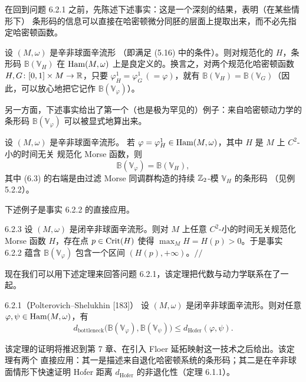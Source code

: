 在回到问题 6.2.1 之前，先陈述下述事实：这是一个深刻的结果，表明（在某些情形下）
条形码的信息可以直接在哈密顿微分同胚的层面上提取出来，而不必先指定哈密顿函数。

设 $(M,\omega)$ 是辛非球面辛流形
（即满足 (5.16) 中的条件）。则对规范化的 $H$，条形码 $\mathbb{B}(\mathbb{V}_H)$
在 $\operatorname{Ham}(M,\omega)$ 上是良定义的。换言之，对两个规范化哈密顿函数
$H,G\colon[0,1]\times M\to\mathbb{R}$，只要 $\varphi_H^1=\varphi_G^1\,(=\varphi)$，就有
$\mathbb{B}(\mathbb{V}_H)=\mathbb{B}(\mathbb{V}_G)$（因此，可以放心地把它记作
$\mathbb{B}(\mathbb{V}_\varphi)$）。

另一方面，下述事实给出了第一个（也是极为罕见的）例子：来自哈密顿动力学的条形码
$\mathbb{B}(\mathbb{V}_\varphi)$ 可以被显式地算出来。

设 $(M,\omega)$ 是辛非球面辛流形。
若 $\varphi=\varphi_H^1\in\operatorname{Ham}(M,\omega)$，其中 $H$ 是 $M$ 上 $C^2$-小的时间无关
规范化 Morse 函数，则
\begin{equation}\tag{6.3}
  \mathbb{B}(\mathbb{V}_\varphi)=\mathbb{B}(\mathbb{V}_H),
\end{equation}
其中 (6.3) 的右端是由过滤 Morse 同调群构造的持续 $\mathbb{Z}_2$-模 $\mathbb{V}_H$ 的条形码
（见例 5.2.2）。

下述例子是事实 6.2.2 的直接应用。

\begin{wexam}{6.2.3}
  设 $(M,\omega)$ 是闭辛非球面辛流形。则对 $M$ 上任意 $C^2$-小的时间无关规范化
  Morse 函数 $H$，存在点 $p\in\operatorname{Crit}(H)$ 使得 $\max_M H=H(p)>0$。于是事实 6.2.2
  蕴含 $\mathbb{B}(\mathbb{V}_\varphi)$ 包含一个区间 $(H(p),+\infty)$。\hfill$//$
\end{wexam}

现在我们可以用下述定理来回答问题 6.2.1，该定理把代数与动力学联系在了一起。

\begin{wthm}{6.2.1（Polterovich--Shelukhin [183]）}
  设 $(M,\omega)$ 是闭辛非球面辛流形。则对任意
  $\varphi,\psi\in\operatorname{Ham}(M,\omega)$，有
  \[
    d_{\mathrm{bottleneck}}\bigl(\mathbb{B}(\mathbb{V}_\varphi),
    \mathbb{B}(\mathbb{V}_\psi)\bigr)\le d_{\mathrm{Hofer}}(\varphi,\psi).
  \]
\end{wthm}

该定理的证明将推迟到第 7 章、在引入 Floer 延拓映射这一技术之后给出。该定理有两个
直接应用：其一是描述来自退化哈密顿系统的条形码；其二是在辛非球面情形下快速证明
Hofer 距离 $d_{\mathrm{Hofer}}$ 的非退化性（定理 6.1.1）。

